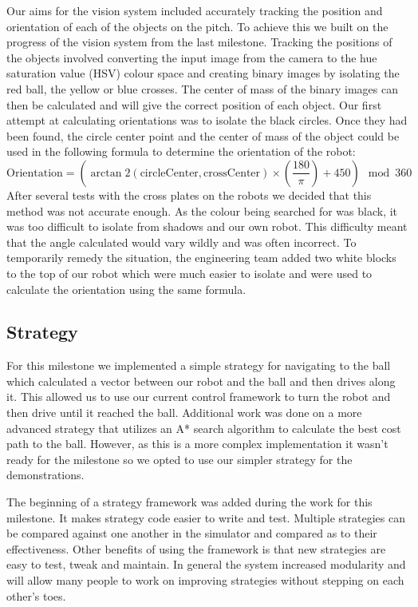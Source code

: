 \documentclass[12pt, a4paper, titlepage]{article}
\begin{document}
Our aims for the vision system included accurately tracking the position and
orientation of each of the objects on the pitch. To achieve this we built on the
progress of the vision system from the last milestone. Tracking the positions
of the objects involved converting the input image from the camera to the hue
saturation value (HSV) colour space and creating binary images by isolating the
red ball, the yellow or blue crosses. The center of mass of the binary images
can then be calculated and will give the correct position of each object. Our
first attempt at calculating orientations was to isolate the black circles.
Once they had been found, the circle center point and the center of mass of the
object could be used in the following formula to determine the orientation of
the robot:
\begin{equation*}
\mbox{Orientation} = (\arctan2(\mbox{circleCenter}, \mbox{crossCenter}) \times \left(\frac{180}{\pi}\right) + 450) \mod 360
\end{equation*}
After several tests with the cross plates on the robots we
decided that this method was not accurate enough. As the colour being searched
for was black, it was too difficult to isolate from shadows and our own robot.
This difficulty meant that the angle calculated would vary wildly and was often
incorrect. To temporarily remedy the situation, the engineering team added two
white blocks to the top of our robot which were much easier to isolate and were
used to calculate the orientation using the same formula.

\subsection{Strategy}

For this milestone we implemented a simple strategy for navigating to the ball
which calculated a vector between our robot and the ball and then drives along
it. This allowed us to use our current control framework to turn the robot
and then drive until it reached the ball. Additional work was done on a more
advanced strategy that utilizes an A* search algorithm to calculate the best
cost path to the ball. However, as this is a more complex implementation it
wasn't ready for the milestone so we opted to use our simpler strategy for the
demonstrations.

The beginning of a strategy framework was added during the work for this
milestone. It makes strategy code easier to write and test. Multiple strategies
can be compared against one another in the simulator and compared as to their
effectiveness. Other benefits of using the framework is that new strategies are
easy to test, tweak and maintain. In general the system increased modularity and
will allow many people to work on improving strategies without stepping on each
other's toes.
\end{document}
